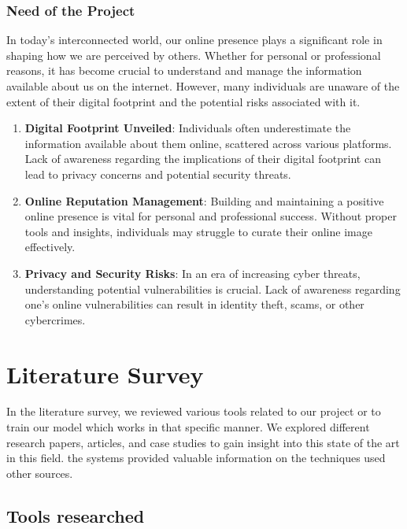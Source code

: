 \documentclass[openany]{report}
\begin{document}
\subsection{Need of the Project}
In today's interconnected world, our online presence plays a significant role in shaping how we are perceived by others. Whether for personal or professional reasons, it has become crucial to understand and manage the information available about us on the internet. However, many individuals are unaware of the extent of their digital footprint and the potential risks associated with it.


\begin{enumerate}
    \item \textbf{Digital Footprint Unveiled}:
          Individuals often underestimate the information available about them online, scattered across various platforms.
          Lack of awareness regarding the implications of their digital footprint can lead to privacy concerns and potential security threats.
    \item \textbf{Online Reputation Management}:
          Building and maintaining a positive online presence is vital for personal and professional success.
          Without proper tools and insights, individuals may struggle to curate their online image effectively.
    \item \textbf{Privacy and Security Risks}:
          In an era of increasing cyber threats, understanding potential vulnerabilities is crucial.
          Lack of awareness regarding one's online vulnerabilities can result in identity theft, scams, or other cybercrimes.
\end{enumerate}

\chapter{Literature Survey}


In the literature survey, we reviewed various tools related to our project or to train our model which works in that specific manner. We explored different research papers, articles, and case studies to gain insight into this state of the art in this field. the systems provided valuable information on the techniques used other sources.

\section{Tools researched}
\end{document}
